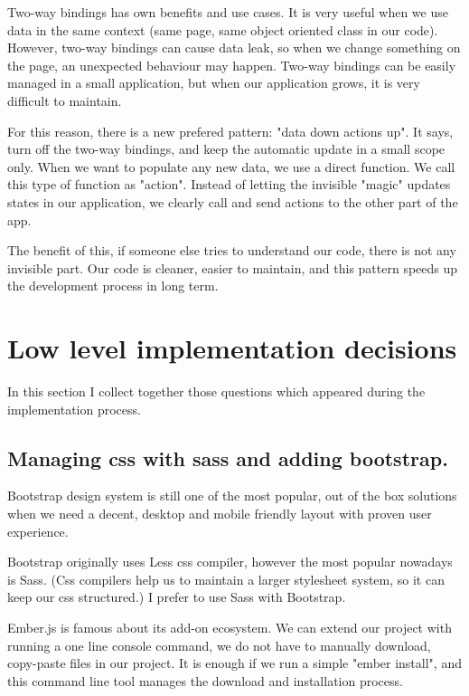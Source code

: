 \documentclass[12pt, a4paper, oneside, openright, medskipamount]{report}
\begin{document}
Two-way bindings has own benefits and use cases. It is very useful when we use data in the same context (same page, same object oriented class in our code). However, two-way bindings can cause data leak, so when we change something on the page, an unexpected behaviour may happen. Two-way bindings can be easily managed in a small application, but when our application grows, it is very difficult to maintain.

For this reason, there is a new prefered pattern: "data down actions up". It says, turn off the two-way bindings, and keep the automatic update in a small scope only. When we want to populate any new data, we use a direct function. We call this type of function as "action". Instead of letting the invisible "magic" updates states in our application, we clearly call and send actions to the other part of the app.

The benefit of this, if someone else tries to understand our code, there is not any invisible part. Our code is cleaner, easier to maintain, and this pattern speeds up the development process in long term.

\section{Low level implementation decisions}

In this section I collect together those questions which appeared during the implementation process.

\subsection{Managing css with sass and adding bootstrap.}

Bootstrap\cite{bootstrap} design system is still one of the most popular, out of the box solutions when we need a decent, desktop and mobile friendly layout with proven user experience.

Bootstrap originally uses Less \cite{less} css compiler, however the most popular nowadays is Sass\cite{sass}. (Css compilers help us to maintain a larger stylesheet system, so it can keep our css structured.) I prefer to use Sass with Bootstrap.

Ember.js is famous about its add-on ecosystem. We can extend our project with running a one line console command, we do not have to manually download, copy-paste files in our project. It is enough if we run a simple "ember install", and this command line tool manages the download and installation process.
\end{document}
